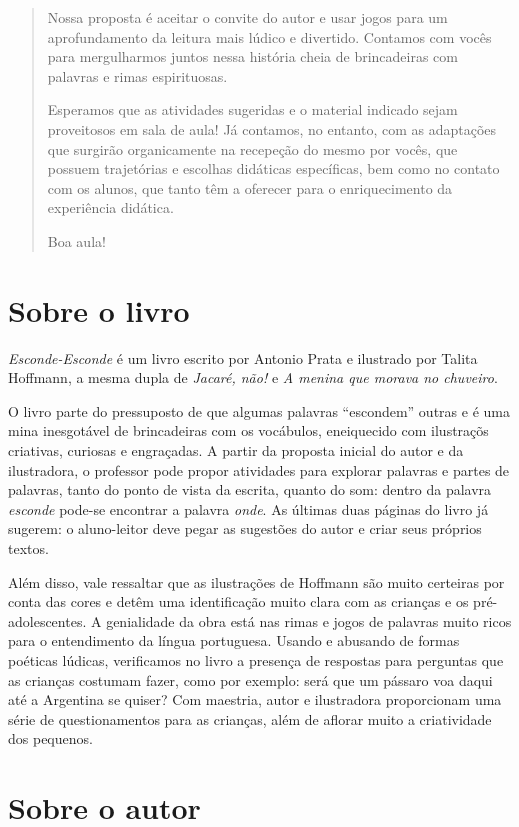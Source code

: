 \documentclass[11pt]{extarticle}
\begin{document}
\begin{abstract}
Nossa proposta é aceitar o convite do autor e usar jogos para um aprofundamento da leitura mais lúdico e divertido. Contamos com vocês para mergulharmos juntos nessa história cheia de brincadeiras com palavras e rimas espirituosas. 

Esperamos que as atividades sugeridas e o material indicado sejam proveitosos em sala de aula! Já contamos, no entanto, com as adaptações
que surgirão organicamente na recepeção do mesmo por vocês, que possuem 
trajetórias e escolhas didáticas específicas, bem como no contato com os 
alunos, que tanto têm a oferecer para o enriquecimento da experiência didática.

Boa aula!

\end{abstract}

\section{Sobre o livro}

\textit{Esconde-Esconde} é um livro escrito por Antonio Prata e ilustrado por Talita Hoffmann, a mesma dupla de \textit{Jacaré, não!} e \textit{A menina que morava no chuveiro}. 

O livro parte do pressuposto de que algumas palavras “escondem” outras e é uma mina inesgotável de brincadeiras com os vocábulos, eneiquecido com ilustraçõs criativas, curiosas e engraçadas. A partir da proposta inicial do autor e da ilustradora, o professor pode propor atividades para explorar palavras e partes de palavras, tanto do ponto de vista da escrita, quanto do som: dentro da palavra \textit{esconde} pode-se encontrar a palavra \textit{onde}. As últimas duas páginas do livro já sugerem: o aluno-leitor deve pegar as sugestões do autor e criar seus próprios textos.

Além disso, vale ressaltar que as ilustrações de Hoffmann são muito certeiras por conta das cores e detêm uma identificação muito clara com as crianças e os pré-adolescentes. A genialidade da obra está nas rimas e jogos de palavras muito ricos para o entendimento da língua portuguesa. Usando e abusando de formas poéticas lúdicas, verificamos no livro a presença de respostas para perguntas que as crianças costumam fazer, como por exemplo: será que um pássaro voa daqui até a Argentina se quiser? Com maestria, autor e ilustradora proporcionam uma série de questionamentos para as crianças, além de aflorar muito a criatividade dos pequenos.

\section{Sobre o autor}
\end{document}
